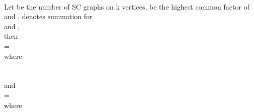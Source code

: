 \documentclass[12pt,conference]{IEEEtran}
\begin{document}
\paragraph*{} Let  be the number of SC graphs on k vertices,
 be the highest common factor of  and ,
 denotes summation for \\
 and ,\\
then \\
\hspace*{1cm}  =   \\
where \\
 \\ \\
and \\
\hspace*{1cm}  =   \\
where \\ 
\\
\end{document}
